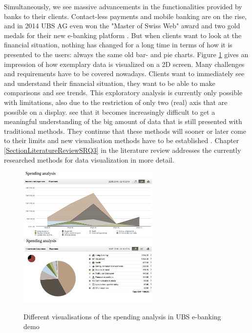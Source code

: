 Simultaneously, we see massive advancements in the functionalities provided by banks to their clients. Contact-less payments and mobile banking are on the rise, and in 2014 UBS AG even won the "Master of Swiss Web" award and two gold medals for their new e-banking platform \citep{UBSAG2014}. But when clients want to look at the financial situation, nothing has changed for a long time in terms of how it is presented to the users: always the same old bar- and pie charts. Figure \ref{fig:ubsspendinganalysis} gives an impression of how exemplary data is visualized on a 2D screen. Many challenges and requirements have to be covered nowadays. Clients want to immediately see and understand their financial situation, they want to be able to make comparisons and see trends. This exploratory analysis is currently only possible with limitations, also due to the restriction of only two (real) axis that are possible on a display. \cite{Jamieson2007} see that it becomes increasingly difficult to get a meaningful understanding of the big amount of data that is still presented with traditional methods. They continue that these methods will sooner or later come to their limits and new visualisation methods have to be established \citep{Jamieson2007}. Chapter \ref{SectionLiteratureReviewSRQ3} in the literature review addresses the currently researched methods for data visualization in more detail.
\begin{figure}[h]
	\begin{center}
		\includegraphics[width=7cm]{03_Figures/06_Introduction/UBSAG2016_SpendingAnalysis2.png}
		\includegraphics[width=7cm]{03_Figures/06_Introduction/UBSAG2016_SpendingAnalysis.png}
		\caption[Different visualisations of the spending analysis in UBS e-banking demo]{Different visualisations of the spending analysis in UBS e-banking demo \citep{UBSAG2016}}
		\label{fig:ubsspendinganalysis}
	\end{center}
\end{figure}

